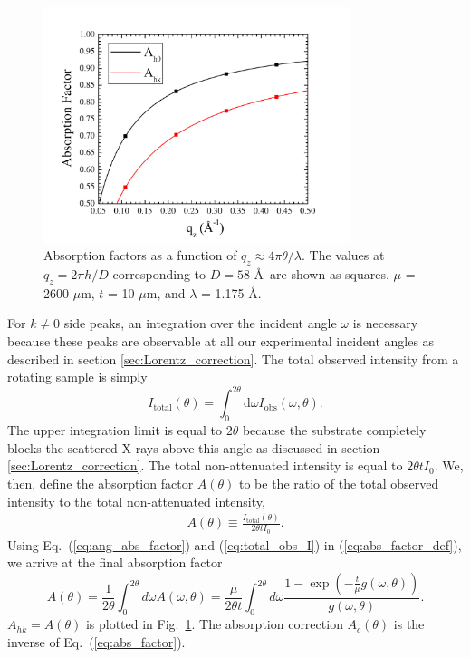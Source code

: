 \begin{figure}[htbp]
  \centering
  \includegraphics[width=0.8\textwidth]{figures/ripple/analysis/abs_factor}
  \caption{Absorption factors as a function of $q_z \approx 4\pi\theta/\lambda$.
  The values at $q_z=2\pi h/D$ corresponding to $D=58$ \AA\ are shown as squares.
  $\mu$ = 2600 $\mu$m, $t$ = 10 $\mu$m, and $\lambda$ = 1.175 \AA.}
  \label{fig:abs_factor}
\end{figure}

For $k\neq 0$ side peaks, an integration over the incident angle $\omega$
is necessary because these peaks are observable at all our experimental incident angles as
described in section \ref{sec:Lorentz_correction}.
The total observed intensity from a rotating sample is simply
\begin{equation}
  I_{\textrm{total}}(\theta) 
  = \int_0^{2\theta}\textrm{d}\omega I_{\textrm{obs}}(\omega,\theta).
  \label{eq:total_obs_I}
\end{equation}
The upper integration limit is equal to $2\theta$ because the substrate
completely blocks the scattered X-rays above this angle as discussed in 
section \ref{sec:Lorentz_correction}.
The total non-attenuated intensity is equal to $2\theta t I_0$. We, then, 
define the absorption factor $A(\theta)$ to be the ratio of the total 
observed intensity to the total non-attenuated intensity,
\begin{align}
  A(\theta) \equiv \frac{I_\textrm{total}(\theta)}{2\theta tI_0}. 
  \label{eq:abs_factor_def}
\end{align}
Using Eq.~(\ref{eq:ang_abs_factor}) and (\ref{eq:total_obs_I})
in (\ref{eq:abs_factor_def}), we arrive
at the final absorption factor
\begin{equation}
  A(\theta) = \frac{1}{2\theta}\int_0^{2\theta}d\omega A(\omega,\theta)
  = \frac{\mu}{2\theta t} \int_0^{2\theta}d\omega 
  \frac{1-\exp\left(-\frac{t}{\mu}g(\omega,\theta)\right)}{g(\omega,\theta)}.
  \label{eq:abs_factor}
\end{equation}
$A_{hk} = A(\theta)$ is plotted in Fig.~\ref{fig:abs_factor}.
The absorption correction $A_c(\theta)$ is the inverse of Eq.~(\ref{eq:abs_factor}). 


